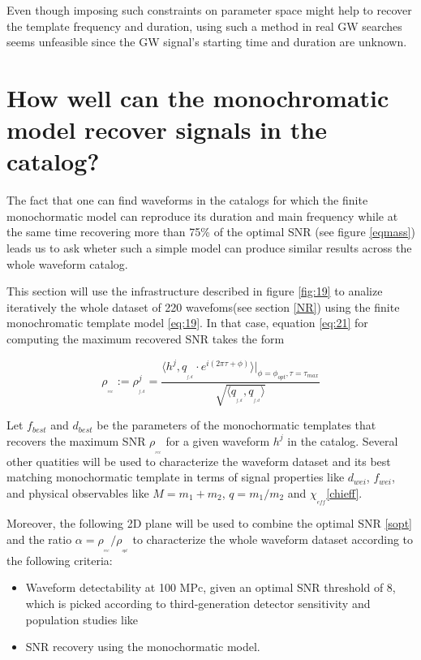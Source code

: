 Even though imposing such constraints on parameter space might help to recover the template frequency and duration, using such a method in real GW searches seems unfeasible since the GW signal's starting time and duration are unknown.

\newpage
\section{How well can the monochromatic model recover signals in the catalog?}

The fact that one can find waveforms in the catalogs for which the finite monochormatic model can reproduce its duration and main frequency while at the same time recovering more than 75\%  of the optimal SNR (see figure \ref{eqmass}) leads us to ask wheter such a simple model can produce similar results across the whole waveform catalog. 
 
This section will use the infrastructure described in figure \ref{fig:19} to analize iteratively the whole dataset of 220 wavefoms(see section \ref{NR}) using the finite monochromatic template model \ref{eq:19}. In that case, equation \ref{eq:21} for computing the maximum recovered SNR takes the form 


\begin{equation}\label{eq:22}
\rho_{_{_{rec}}} := \rho^j_{_{_{f,d}}} = \frac{\langle h^j, q_{_{_{f,d}}}\cdot e^{i(2\pi \tau+\phi)}\rangle \bigg\rvert_{\phi =\phi_{opt},\tau =\tau_{max}}}{\sqrt{\langle  q_{_{_{f,d}}},q_{_{_{f,d}}} \rangle}}
\end{equation}



Let $f_{best}$ and $d_{best}$ be the parameters of the monochormatic templates that recovers the maximum SNR $\rho_{_{_{rec}}}$ for a given waveform $h^j$ in the catalog. Several other quatities will be used to characterize the waveform dataset and its best matching monochormatic template in terms of signal properties like $d_{wei}$, $f_{wei}$, and physical observables like $M=m_1+m_2$, $q=m_1/m_2$ and $\chi_{_{eff}}$\ref{chieff}.


Moreover, the following 2D plane will be used to combine the optimal SNR \ref{sopt} and the ratio $\alpha=\rho_{_{_{rec}}}/\rho_{_{_{opt}}}$ to characterize the whole waveform dataset according to the following criteria:

\begin{itemize}

\item Waveform detectability at 100 MPc, given an optimal SNR threshold of 8, which is picked according to third-generation detector sensitivity and population studies like \cite[section 3]{https://doi.org/10.48550/arxiv.2109.09882}

\item SNR recovery using the monochormatic model.


\end{itemize}

